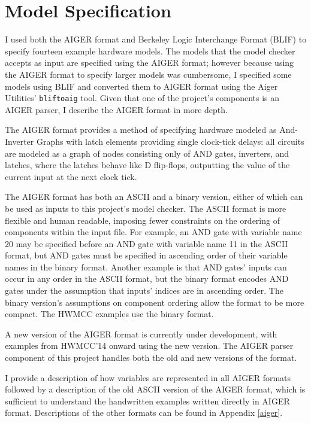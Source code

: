 \documentclass[12pt,a4paper,twoside,openright]{report}
\begin{document}
\section{Model Specification}
\label{prep:aiger}


I used both the AIGER format and Berkeley Logic Interchange Format (BLIF)
to specify fourteen example hardware models.
The models that the model checker accepts as input
are specified using the AIGER format;
however because using the AIGER format to specify larger models was cumbersome,
I specified some models using BLIF and converted them to AIGER format
using the Aiger Utilities' \verb,bliftoaig, tool. Given that one of
the project's components is an AIGER parser, I describe the AIGER format
in more depth.

The AIGER format provides a method of specifying hardware modeled as
And-Inverter Graphs with latch elements providing single clock-tick
delays: all circuits are modeled as a graph of nodes consisting only of
AND gates, inverters, and latches, where the latches behave like D
flip-flops, outputting the value of the current input at the next
clock tick.

The AIGER format has both an ASCII and a binary version, either of which
can be used as inputs to this project's model checker. The ASCII
format is more flexible and human readable, imposing fewer constraints
on the ordering of components within the input file. For example, an
AND gate with variable name 20 may be specified before an AND gate with
variable name 11 in the ASCII format, but AND gates must be specified in
ascending order of their variable names in the binary format. Another
example is that AND gates' inputs can occur in any order in the ASCII
format, but the binary format encodes AND gates under the assumption
that inputs' indices are in ascending order.
The binary version's assumptions on component ordering allow the format
to be more compact. The HWMCC examples use the binary format.

A new version of the AIGER format is currently under development, with
examples from HWMCC'14 onward using the new version. The AIGER parser component
of this project handles both the old and new versions of the format.

I provide a description of how variables are represented in all AIGER formats
followed by a description of the old ASCII version of the AIGER format, which
is sufficient to understand the handwritten examples written directly
in AIGER format. Descriptions of the other formats can be found in Appendix
\ref{aiger}.
\end{document}
